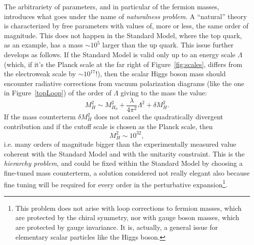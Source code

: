 The arbitrariety of parameters, and in particular of the
fermion masses, introduces what goes under the name of
{\it naturalness problem}. A ``natural'' theory is
characterized by free parameters with values of, more or
less, the same order of magnitude. This does not happen in
the Standard Model, where the top quark, as an example,
has a mass $\sim 10^5$ larger than the up quark.
This issue further develops as follows. If the 
Standard Model is valid only up to  an energy scale 
$\Lambda$ (which, if it's the Planck scale
at the far right of Figure~\ref{fig:scales}, differs
from the electroweak scale by $\sim 10^{17}$!), 
then the scalar Higgs boson mass 
should encounter radiative corrections from 
vacuum polarization diagrams (like the one in Figure~\ref{topLoop}) 
of the order of $\Lambda$ giving to the mass the 
value: %
\begin{equation}\label{eq:higgsMass}
M_{H}^{2} \sim M_{H_{0}}^{2} 
+ \dfrac{\lambda}{4\pi^{2}} \Lambda^{2} 
+ \delta M_{H}^{2}. \end{equation}
If the mass counterterm $\delta M_{H}^{2}$ does not 
cancel the quadratically divergent contribution and 
if the cutoff scale is chosen as the Planck scale, then
\begin{equation}
M_{H}^{2} \sim 10^{32},\end{equation} 
i.e. many orders of magnitude bigger than the experimentally 
measured value coherent with the Standard Model 
and with the unitarity constraint. This  
is the \textit{hierarchy problem}, and 
could be fixed within the Standard Model by 
choosing a fine-tuned mass counterterm, a 
solution considered not really elegant also 
because fine tuning will be required for every 
order in the perturbative expansion\footnote{This 
problem does not arise with loop corrections to 
fermion masses, which are protected by the chiral 
symmetry, nor with gauge boson masses,
which are protected by gauge invariance. It
is, actually, a general issue for elementary scalar particles
like the Higgs boson.}. %


